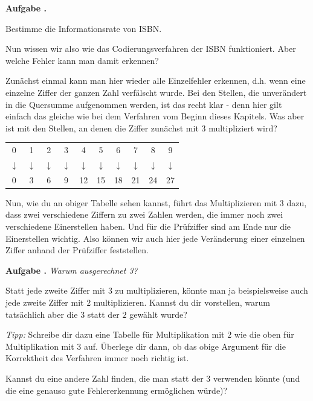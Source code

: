 \documentclass[a4paper,ngerman,12pt]{scrartcl}
\theoremstyle{definition}
\theoremstyle{plain}
\theoremstyle{remark}
\newlength{\aufgabenskip}
\newcounter{aufgabennummer}
\newenvironment{aufgabe}[1]{
	\addtocounter{aufgabennummer}{1}
	\textbf{Aufgabe \theaufgabennummer.} \emph{#1} \par
}{\vspace{\aufgabenskip}}
\begin{document}
\begin{aufgabe}{}
	Bestimme die Informationsrate von ISBN.
\end{aufgabe}

Nun wissen wir also wie das Codierungsverfahren der ISBN funktioniert. Aber welche Fehler kann man damit erkennen? 

Zunächst einmal kann man hier wieder alle Einzelfehler erkennen, d.h. wenn eine einzelne Ziffer der ganzen Zahl verfälscht wurde. Bei den Stellen, die unverändert in die Quersumme aufgenommen werden, ist das recht klar - denn hier gilt einfach das gleiche wie bei dem Verfahren vom Beginn dieses Kapitels. Was aber ist mit den Stellen, an denen die Ziffer zunächst mit $3$ multipliziert wird?

\begin{center}
	\begin{tabular}{cccccccccc}
		0 & 1 & 2 & 3 & 4 & 5 & 6 & 7 & 8 & 9 \\
		$\downarrow$ & $\downarrow$ & $\downarrow$ & $\downarrow$ & $\downarrow$ & $\downarrow$ & $\downarrow$ & $\downarrow$ & $\downarrow$ & $\downarrow$ \\
		0 & 3 & 6 & 9 & 12 & 15 & 18 & 21 & 24 & 27
	\end{tabular}
\end{center}

Nun, wie du an obiger Tabelle sehen kannst, führt das Multiplizieren mit $3$ dazu, dass zwei verschiedene Ziffern zu zwei Zahlen werden, die immer noch zwei verschiedene Einerstellen haben. Und für die Prüfziffer sind am Ende nur die Einerstellen wichtig. Also können wir auch hier jede Veränderung einer einzelnen Ziffer anhand der Prüfziffer feststellen.

\begin{aufgabe}{Warum ausgerechnet 3?}
	Statt jede zweite Ziffer mit $3$ zu multiplizieren, könnte man ja beispielsweise auch jede zweite Ziffer mit $2$ multiplizieren. Kannst du dir vorstellen, warum tatsächlich aber die $3$ statt der $2$ gewählt wurde? 
	
	\emph{Tipp:} Schreibe dir dazu eine Tabelle für Multiplikation mit $2$ wie die oben für Multiplikation mit $3$ auf. Überlege dir dann, ob das obige Argument für die Korrektheit des Verfahren immer noch richtig ist.
	
	Kannst du eine andere Zahl finden, die man statt der $3$ verwenden könnte (und die eine genauso gute Fehlererkennung ermöglichen würde)?
\end{aufgabe}
\end{document}
